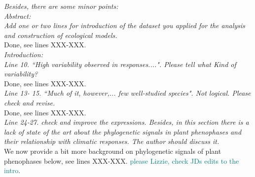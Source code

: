 \documentclass[11pt]{article}
\begin{document}
\emph{Besides, there are some minor points:}\\


\emph{Abstract:}\\
\emph{Add one or two lines for introduction of the dataset you applied for the analysis and construction of ecological models.}\\
Done, see lines XXX-XXX.\\

\emph{Introduction:}\\
\emph{Line 10. ``High variability observed in responses....". Please tell what Kind of variability?}\\
Done, see lines XXX-XXX.\\

\emph{Line 13- 15. ``Much of it, however,... few well-studied species". Not logical. Please check and revise.}\\
Done, see lines XXX-XXX.\\

\emph{Line 24-27. check and improve the expressions. Besides, in this section there is a lack of state of the art about the phylogenetic signals in plant phenophases and their relationship with climatic responses. The author should discuss it.}\\
We now provide a bit more background on phylogenetic signals of plant phenophases below, see lines XXX-XXX.
\textcolor{teal}{please Lizzie, check JDs edits to the intro}. 
\\
\end{document}
